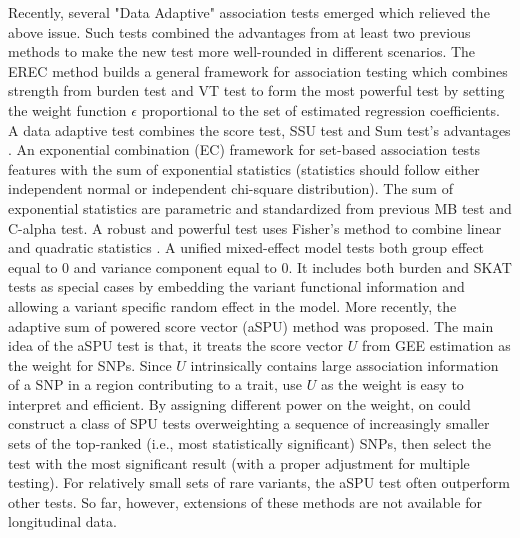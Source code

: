 \documentclass[12pt]{article}
\begin{document}
Recently, several "Data Adaptive" association tests emerged which relieved the above issue. Such tests combined the advantages from at least two previous methods to make the new test more well-rounded in different scenarios. The EREC method \cite{Lin2011} builds a general framework for association testing which combines strength from burden test and VT test to form the most powerful test by setting the weight function $\epsilon$ proportional to the set of estimated regression coefficients. A data adaptive test combines the score test, SSU test and Sum test's advantages \cite{Pan2011}. An exponential combination (EC) framework for set-based association tests \cite{Chen2012} features with the sum of exponential statistics (statistics should follow either independent normal or independent chi-square distribution). The sum of exponential statistics are parametric and standardized from previous MB test and C-alpha test. A robust and powerful test uses Fisher's method to combine linear and quadratic statistics \cite{Derkach2013}. A unified mixed-effect model \cite{Sun2013} tests both group effect equal to 0 and variance component equal to 0. It includes both burden and SKAT tests as special cases by embedding the variant functional information and allowing a variant specific random effect in the model. More recently, the adaptive sum of powered score vector (aSPU) method \cite{pan2014powerful} was proposed. The main idea of the aSPU test is that, 
it treats the score vector $U$ from GEE estimation as the weight for SNPs. Since $U$ intrinsically contains large association information of a SNP in a region contributing to a trait, use $U$ as the weight is easy to interpret and efficient. By assigning different power on the weight, on could construct a class of  SPU tests overweighting a sequence of increasingly smaller sets of the top-ranked (i.e., most statistically significant) SNPs, then select the test with the most significant result (with a proper adjustment for multiple testing). For relatively small sets of rare variants, the aSPU test often outperform other tests. \cite{pan2014powerful}
So far, however, extensions of these methods are not available for longitudinal data.
\end{document}
